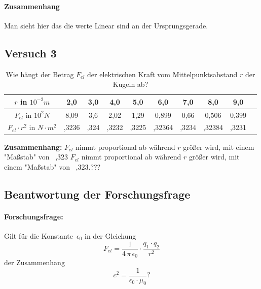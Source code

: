 \documentclass{report}
\begin{document}
\paragraph{Zusammenhang} Man sieht hier das die werte Linear sind an der Ursprungsgerade.


\subsection{Versuch 3}
\begin{table}[htpb]
	\setlength{\tabcolsep}{15pt}
	\renewcommand{\arraystretch}{2.2}
	\centering
	\begin{tabular}{|c|c|c|c|c|c|c|c|c|c|}
		\hline
    $r$ in $10^{-2}m$ & 2,0 & 3,0 & 4,0 & 5,0 & 6,0 & 7,0 & 8,0 & 9,0 \\
		\hline 
    $F_{el}$ in $10^2N$ & 8,09 & 3,6 & 2,02 & 1,29 & 0,899 & 0,66 & 0,506 & 0,399 \\
		\hline 
    $F_{el}\cdot r^2$ in $N\cdot m^2$ & ,3236 & ,324 & ,3232 & ,3225 & ,32364 & ,3234 & ,32384 & ,3231 \\
		\hline
	\end{tabular}
	\caption{Wie hängt der Betrag $F_{el}$ der elektrischen Kraft vom Mittelpunktsabstand $r$ der Kugeln ab?}
	\label{tab:table-tab-3-2}
\end{table}


\noindent\textbf{Zusammenhang:} $F_{el}$ nimmt proportional ab während $r$ größer wird,
mit einem "Maßstab" von ~,323 $F_{el}$ nimmt proportional ab während $r$ größer
wird, mit einem "Maßstab" von ~,323.???

\clearpage
\subsection{Beantwortung der Forschungsfrage}
\paragraph{Forschungsfrage:} 
Gilt für die Konstante~$\epsilon_0$ in der Gleichung 
	$$F_{el} = \dfrac{1}{4 \, \pi \, \epsilon_0} \cdot \dfrac{q_1 \cdot q_2}{r^2}$$ 
	der Zusammenhang
	$$c^2 = \dfrac{1}{\epsilon_0 \cdot \mu_0}?$$ 
\end{document}
